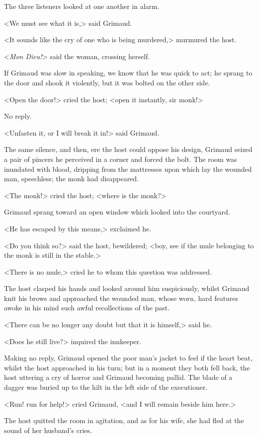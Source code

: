 The three listeners looked at one another in alarm.

<We must see what it is,> said Grimaud.

<It sounds like the cry of one who is being murdered,> murmured the host.

<\textit{Mon Dieu!}> said the woman, crossing herself.

If Grimaud was slow in speaking, we know that he was quick to act; he sprang to the door and shook it violently, but it was bolted on the other side.

<Open the door!> cried the host; <open it instantly, sir monk!>

No reply.

<Unfasten it, or I will break it in!> said Grimaud.

The same silence, and then, ere the host could oppose his design, Grimaud seized a pair of pincers he perceived in a corner and forced the bolt. The room was inundated with blood, dripping from the mattresses upon which lay the wounded man, speechless; the monk had disappeared.

<The monk!> cried the host; <where is the monk?>

Grimaud sprang toward an open window which looked into the courtyard.

<He has escaped by this means,> exclaimed he.

<Do you think so?> said the host, bewildered; <boy, see if the mule belonging to the monk is still in the stable.>

<There is no mule,> cried he to whom this question was addressed.

The host clasped his hands and looked around him suspiciously, whilst Grimaud knit his brows and approached the wounded man, whose worn, hard features awoke in his mind such awful recollections of the past.

<There can be no longer any doubt but that it is himself,> said he.

<Does he still live?> inquired the innkeeper.

Making no reply, Grimaud opened the poor man's jacket to feel if the heart beat, whilst the host approached in his turn; but in a moment they both fell back, the host uttering a cry of horror and Grimaud becoming pallid. The blade of a dagger was buried up to the hilt in the left side of the executioner.

<Run! run for help!> cried Grimaud, <and I will remain beside him here.>

The host quitted the room in agitation, and as for his wife, she had fled at the sound of her husband's cries. 